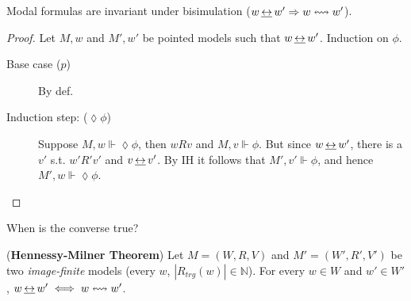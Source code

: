 \begin{figure}[ht]
\begin{minipage}[b]{0.3\linewidth}
\begin{center}
\end{center}
\end{minipage}
\end{figure}

\begin{proposition}Modal formulas are invariant under bisimulation ($w \,\underline{\leftrightarrow}\, w' \Rightarrow w \leftrightsquigarrow w'$).
\label{prop:bisim-imp-eq}
\end{proposition}

\begin{proof}Let $M,w$ and $M',w'$ be pointed models such that $w \,\underline{\leftrightarrow}\, w'$. Induction on $\phi$. 
\begin{description}
\item[Base case ($p$)] By def.
\item[Induction step: ($\lozenge \phi$)] Suppose $M, w \Vdash \lozenge \phi$, then $wRv$ and $M, v \Vdash \phi$. But since $w\,\underline{\leftrightarrow}\, w'$, there is a $v'$ s.t. $w'R'v'$ and $v \,\underline{\leftrightarrow}\, v'$. By IH it follows that $M', v' \Vdash \phi$, and hence $M', w \Vdash \lozenge\phi$.
\end{description}
\end{proof}
When is the converse true? 
\begin{proposition} (\textbf{Hennessy-Milner Theorem}) Let $M = (W, R, V)$ and $M' = (W', R', V')$ be two \textit{image-finite} models (every $w$, $|R_{trg}(w)| \in \mathbb N$). For every $w \in W$ and $w' \in W'$, $w \,\underline{\leftrightarrow}\, w' \iff w \leftrightsquigarrow w'$. 
\end{proposition}

